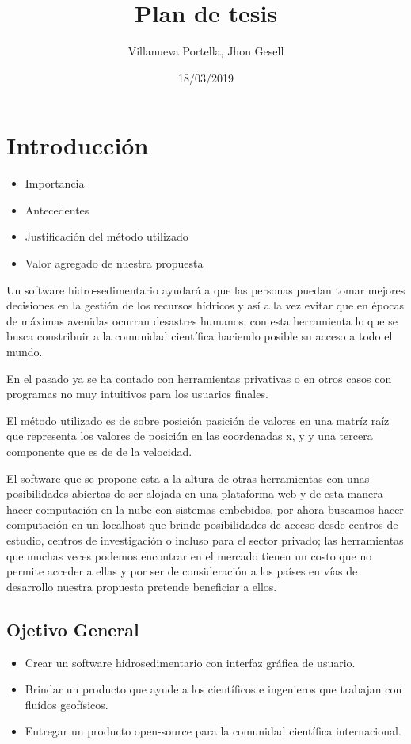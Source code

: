 \documentclass[12pt,a4paper]{report}
\begin{document}
\title{Plan de tesis}
\author{Villanueva Portella, Jhon Gesell}
\date{18/03/2019}
\maketitle

\section{Introducci\'on}
	\begin{itemize}
	\item Importancia
	\item Antecedentes
	\item Justificaci\'on del m\'etodo utilizado
	\item Valor agregado de nuestra propuesta	
	\end{itemize}
Un software hidro-sedimentario ayudará a que las personas puedan tomar mejores decisiones en la gesti\'on de los recursos h\'idricos y as\'i a la vez evitar que en \'epocas de m\'aximas avenidas ocurran desastres humanos, con esta herramienta lo que se busca constribuir a la comunidad cient\'ifica haciendo posible su acceso a todo el mundo.

En el pasado ya se ha contado con herramientas privativas o en otros casos con programas no muy intuitivos para los usuarios finales.

El m\'etodo utilizado es de sobre posición pasición de valores en una matríz raíz que representa los valores de posición en las coordenadas x, y y una tercera componente que es de de la velocidad.

El software que se propone esta a la altura de otras herramientas con unas posibilidades abiertas de ser alojada en una plataforma web y de esta manera hacer computaci\'on en la nube con sistemas embebidos, por ahora buscamos hacer computaci\'on en un localhost que brinde posibilidades de acceso desde centros de estudio, centros de investigaci\'on o incluso para el sector privado; las herramientas que muchas veces podemos encontrar en el mercado tienen un costo que no permite acceder a ellas y por ser de consideraci\'on a los pa\'ises en v\'ias de desarrollo nuestra propuesta pretende beneficiar a ellos.
	\subsection{Ojetivo General}
	\begin{itemize}
	\item Crear un software hidrosedimentario con interfaz gr\'afica de usuario.
	\item Brindar un producto que ayude a los cient\'ificos e ingenieros que trabajan con flu\'idos geof\'isicos.
	\item Entregar un producto open-source para la comunidad cient\'ifica internacional.
	\end{itemize}
\end{document}
